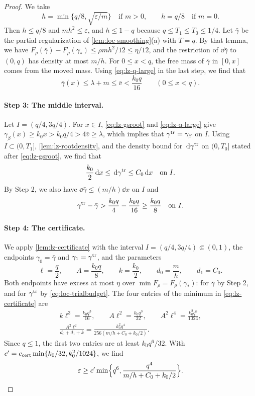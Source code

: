 \begin{proof}
We take
\[
 h=\min\{q/8,\sqrt{\varepsilon/m}\}\quad\text{if }m>0,
 \qquad h=q/8\quad\text{if }m=0 .
\]
Then $h\le q/8$ and $mh^2\le\varepsilon$, and $h\le1-q$ because $q\le
T_1\le T_0\le1/4$. Let $\bar\gamma$ be the partial regularization of
\cref{lem:loc-smoothing}(a) with $T=q$. By that lemma, we have
$F_\rho(\bar\gamma)-F_\rho(\gamma_*)\le\rho mh^2/12\le\eta/12$, and the
restriction of $\dd\bar\gamma$ to $(0,q)$ has density at most $m/h$. For
$0\le x<q$, the free mass of $\bar\gamma$ in $[0,x]$ comes from the moved
mass. Using \eqref{eq:lz-q-large} in the last step, we find that
\[
 \bar\gamma(x)\le\lambda+m\le\bar v<\frac{k_0q}{16}
 \qquad(0\le x<q).
\]

\paragraph{Step 3: The middle interval.}
Let $I=(q/4,3q/4)$. For $x\in I$, \eqref{eq:lz-gsroot} and
\eqref{eq:lz-q-large} give $\gamma_\beta(x)\ge k_0x>k_0q/4>4\bar v\ge\lambda$,
which implies that $\gamma^{\rm tr}=\gamma_\beta$ on $I$. Using
$I\subset(0,T_1]$, \cref{lem:lz-rootdensity}, and the density bound for
$\,\mathrm d\gamma^{\rm tr}$ on $(0,T_0]$ stated after \eqref{eq:lz-gsroot}, we find
that
\[
 \frac{k_0}2\,\mathrm d x\le\,\mathrm d\gamma^{\rm tr}\le C_0\,\mathrm d x\quad\text{on }I .
\]
By Step 2, we also have $\dd\bar\gamma\le(m/h)\dd x$ on $I$ and
\[
 \gamma^{\rm tr}-\bar\gamma>\frac{k_0q}4-\frac{k_0q}{16}\ge\frac{k_0q}8
 \quad\text{on }I .
\]

\paragraph{Step 4: The certificate.}
We apply \cref{lem:lz-certificate} with the interval
$I=(q/4,3q/4)\Subset(0,1)$, the endpoints $\gamma_0=\bar\gamma$ and
$\gamma_1=\gamma^{\rm tr}$, and the parameters
\[
 \ell=\frac q2,\qquad A=\frac{k_0q}8,\qquad k=\frac{k_0}2,
 \qquad d_0=\frac mh,\qquad d_1=C_0 .
\]
Both endpoints have excess at most $\eta$ over $\min F_\rho=F_\rho(\gamma_*)$:
for $\bar\gamma$ by Step 2, and for $\gamma^{\rm tr}$ by
\eqref{eq:loc-trialbudget}. The four entries of the minimum in
\eqref{eq:lz-certificate} are
\[
 \begin{gathered}
 k\ell^3=\frac{k_0q^3}{16},\qquad A\ell^2=\frac{k_0q^3}{32},\qquad
 A^2\ell^4=\frac{k_0^2q^6}{1024},\\
 \frac{A^2\ell^2}{d_0+d_1+k}=\frac{k_0^2q^4}{256(m/h+C_0+k_0/2)}.
 \end{gathered}
\]
Since $q\le1$, the first two entries are at least $k_0q^6/32$. With
$c'=c_{\rm cert}\min\{k_0/32,k_0^2/1024\}$, we find
\begin{equation}\label{eq:lz-balance}
 \varepsilon\ge c'\min\Bigl\{q^6,\frac{q^4}{m/h+C_0+k_0/2}\Bigr\}.
\end{equation}


\end{proof}
